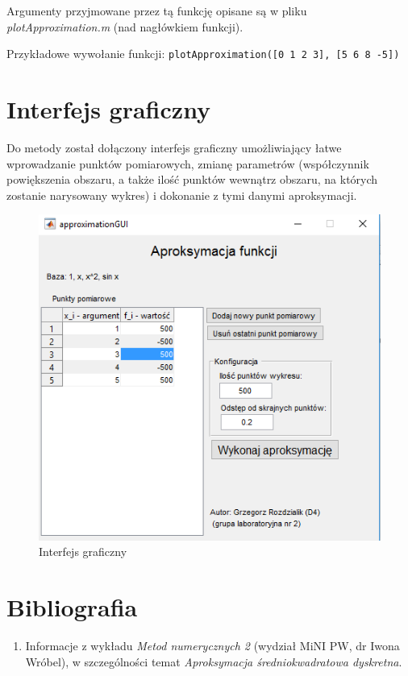 \documentclass[12pt]{article}
\begin{document}
	Argumenty przyjmowane przez tą funkcję opisane są w pliku \textit{plotApproximation.m} (nad nagłówkiem funkcji).
	
	Przykładowe wywołanie funkcji:
	\texttt{plotApproximation([0 1 2 3], [5 6 8 -5])}
	
	
	\section{Interfejs graficzny}
	Do metody został dołączony interfejs graficzny umożliwiający łatwe wprowadzanie punktów pomiarowych, zmianę parametrów (współczynnik powiększenia obszaru, a także ilość punktów wewnątrz obszaru, na których zostanie narysowany wykres) i dokonanie z tymi danymi aproksymacji.
	
	\begin{figure}[H]
		\centering
		\includegraphics[scale=1]{images/gui.png}
		\caption{Interfejs graficzny}
		\label{GUI}
	\end{figure}
	
	
	
	\section{Bibliografia}
	\begin{enumerate}
		\item Informacje z wykładu \textit{Metod numerycznych 2} (wydział MiNI PW, dr Iwona Wróbel), w szczególności temat \textit{Aproksymacja średniokwadratowa dyskretna}.
	\end{enumerate}
	
\end{document}
